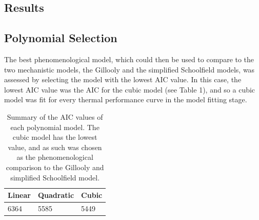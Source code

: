 \documentclass[11pt]{article}
\begin{document}
\begin{linenumbers}
\section{Results}
\subsection{Polynomial Selection}
The best phenomenological model, which could then be used to compare to the two mechanistic models, the Gillooly and the simplified Schoolfield models, was assessed by selecting the model with the lowest AIC value. In this case, the lowest AIC value was the AIC for the cubic model (see Table 1), and so a cubic model was fit for every thermal performance curve in the model fitting stage.

\end{linenumbers}
\begin{table}[h]
\centering
\begin{tabularx}{\textwidth}{| X | X | X |}
 \hline
 Linear & Quadratic & Cubic \\ 
 \hline
 6364 & 5585 & 5449 \\ 
 \hline
\end{tabularx}
\caption{\label{Table 1} Summary of the AIC values of each polynomial model. The cubic model has the lowest value, and as such was chosen as the phenomenological comparison to the Gillooly and simplified Schoolfield model.}
\end{table}
\end{document}
